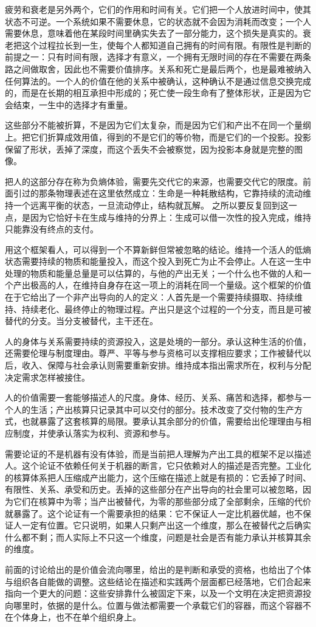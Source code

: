 疲劳和衰老是另外两个，它们的作用和时间有关。它们把一个人放进时间中，使其状态不可逆。一个系统如果不需要休息，它的状态就不会因为消耗而改变；一个人需要休息，意味着他在某段时间里确实失去了一部分能力，这个损失是真实的。衰老把这个过程拉长到一生，使每个人都知道自己拥有的时间有限。有限性是判断的前提之一：只有时间有限，选择才有意义，一个拥有无限时间的存在不需要在两条路之间做取舍，因此也不需要价值排序。关系和死亡是最后两个，也是最难被纳入任何算法的。一个人的价值在他的关系中被确认，这种确认不是通过信息交换完成的，而是在长期的相互承担中形成的；死亡使一段生命有了整体形状，正是因为它会结束，一生中的选择才有重量。

这些部分不能被折算，不是因为它们太复杂，而是因为它们和产出不在同一个量纲上。把它们折算成效用值，得到的不是它们的等价物，而是它们的一个投影。投影保留了形状，丢掉了深度，而这个丢失不会被察觉，因为投影本身就是完整的图像。


把人的这部分存在称为负熵体验，需要先交代它的来源，也需要交代它的限度。前面引过的那条物理表述在这里依然成立：生命是一种耗散结构，它靠持续的流动维持一个远离平衡的状态，一旦流动停止，结构就瓦解。\cite{schrodinger1944} 之所以要反复回到这一点，是因为它恰好卡在生成与维持的分界上：生成可以借一次性的投入完成，维持只能靠没有终点的支付。

用这个框架看人，可以得到一个不算新鲜但常被忽略的结论。维持一个活人的低熵状态需要持续的物质和能量投入，而这个投入到死亡为止不会停止。人在这一生中处理的物质和能量总量是可以估算的，与他的产出无关；一个什么也不做的人和一个产出极高的人，在维持自身存在这一项上的消耗在同一个量级。这个框架的价值在于它给出了一个非产出导向的人的定义：人首先是一个需要持续摄取、持续维持、持续老化、最终停止的物理过程。产出只是这个过程的一个分支，而且是可被替代的分支。当分支被替代，主干还在。

人的身体与关系需要持续的资源投入，这是处境的一部分。承认这种生活的价值，还需要伦理与制度理由。尊严、平等与参与资格可以支撑相应要求；工作被替代以后，收入、保障与社会承认则需要重新安排。维持成本指出需求所在，权利与分配决定需求怎样被接住。


人的价值需要一套能够描述人的尺度。身体、经历、关系、痛苦和选择，都参与一个人的生活；产出核算只记录其中可以交付的部分。技术改变了交付物的生产方式，也就暴露了这套核算的局限。要承认其余部分的价值，需要给出伦理理由与相应制度，并使承认落实为权利、资源和参与。

需要论证的不是机器有没有体验，而是当前把人理解为产出工具的框架不足以描述人。这个论证不依赖任何关于机器的断言，它只依赖对人的描述是否完整。工业化的核算体系把人压缩成产出能力，这个压缩在描述上就是有损的：它丢掉了时间、有限性、关系、承受和历史。丢掉的这些部分在产出导向的社会里可以被忽略，因为它们在核算中为零；当产出被替代，为零的那些部分成了全部剩余，压缩的代价就暴露了。这个论证有一个需要承担的结果：它不保证人一定比机器优越，也不保证人一定有位置。它只说明，如果人只剩产出这一个维度，那么在被替代之后确实什么都不剩；而人实际上不只这一个维度，问题是社会是否有能力承认并核算其余的维度。

前面的讨论给出的是价值会流向哪里，给出的是判断和承受的资格，也给出了个体与组织各自能做的调整。这些结论在描述和实践两个层面都已经落地，它们合起来指向一个更大的问题：这些安排靠什么被固定下来，以及一个文明在决定把资源投向哪里时，依据的是什么。位置与做法都需要一个承载它们的容器，而这个容器不在个体身上，也不在单个组织身上。
